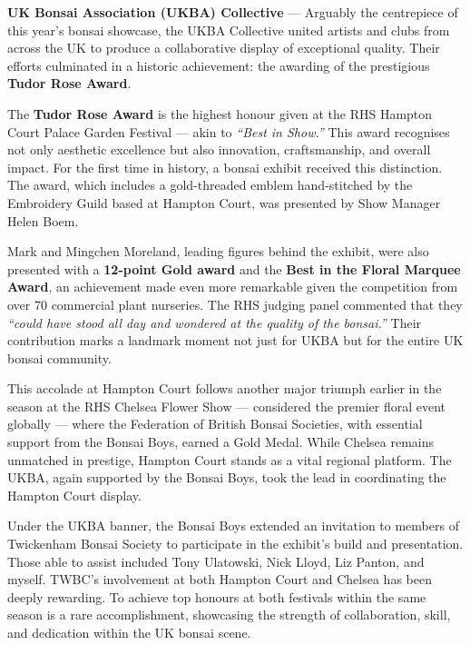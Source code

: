\medskip
\textbf{UK Bonsai Association (UKBA) Collective} --- Arguably the centrepiece of this year's bonsai showcase, the UKBA Collective united artists and clubs from across the UK to produce a collaborative display of exceptional quality.
Their efforts culminated in a historic achievement: the awarding of the prestigious \textbf{Tudor Rose Award}.

\medskip
{}
\noindent
The \textbf{Tudor Rose Award} is the highest honour given at the RHS Hampton Court Palace Garden Festival --- akin to \textit{``Best in Show.''}
This award recognises not only aesthetic excellence but also innovation, craftsmanship, and overall impact.
For the first time in history, a bonsai exhibit received this distinction.
The award, which includes a gold\--threaded emblem hand\--stitched by the Embroidery Guild based at Hampton Court, was presented by Show Manager Helen Boem.

Mark and Mingchen Moreland, leading figures behind the exhibit, were also presented with a \textbf{12\--point Gold award} and the \textbf{Best in the Floral Marquee Award}, an achievement made even more remarkable given the competition from over 70 commercial plant nurseries.
The RHS judging panel commented that they \textit{``could have stood all day and wondered at the quality of the bonsai.''}
Their contribution marks a landmark moment not just for UKBA but for the entire UK bonsai community.

\medskip
{}
\noindent
This accolade at Hampton Court follows another major triumph earlier in the season at the RHS Chelsea Flower Show --- considered the premier floral event globally --- where the Federation of British Bonsai Societies, with essential support from the Bonsai Boys, earned a Gold Medal.
While Chelsea remains unmatched in prestige, Hampton Court stands as a vital regional platform.
The UKBA, again supported by the Bonsai Boys, took the lead in coordinating the Hampton Court display.

\medskip
{}
\noindent
Under the UKBA banner, the Bonsai Boys extended an invitation to members of Twickenham Bonsai Society to participate in the exhibit's build and presentation.
Those able to assist included Tony Ulatowski, Nick Lloyd, Liz Panton, and myself.
TWBC's involvement at both Hampton Court and Chelsea has been deeply rewarding.
To achieve top honours at both festivals within the same season is a rare accomplishment, showcasing the strength of collaboration, skill, and dedication within the UK bonsai scene.

